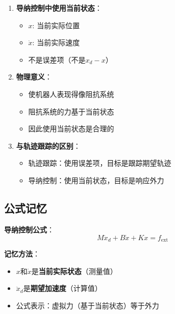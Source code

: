 \documentclass[12pt,a4paper]{article}
\begin{document}
\begin{enumerate}
\item \textbf{导纳控制中使用当前状态}：
\begin{itemize}
\item $x$: 当前实际位置
\item $\dot{x}$: 当前实际速度
\item 不是误差项（不是$x_d - x$）
\end{itemize}

\item \textbf{物理意义}：
\begin{itemize}
\item 使机器人表现得像阻抗系统
\item 阻抗系统的力基于当前状态
\item 因此使用当前状态是合理的
\end{itemize}

\item \textbf{与轨迹跟踪的区别}：
\begin{itemize}
\item 轨迹跟踪：使用误差项，目标是跟踪期望轨迹
\item 导纳控制：使用当前状态，目标是响应外力
\end{itemize}
\end{enumerate}

\subsection{公式记忆}

\textbf{导纳控制公式}：
\begin{equation}
M\ddot{x}_d + B\dot{x} + Kx = f_{\text{ext}}
\end{equation}

\textbf{记忆方法}：
\begin{itemize}
\item $x$和$\dot{x}$是\textbf{当前实际状态}（测量值）
\item $\ddot{x}_d$是\textbf{期望加速度}（计算值）
\item 公式表示：虚拟力（基于当前状态）等于外力
\end{itemize}
\end{document}
